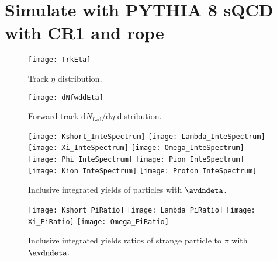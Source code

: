 
\section{Simulate with PYTHIA 8 sQCD with CR1 and rope}%
\label{sec:CRorRope}

\begin{figure}[t]
        \begin{center}
                \texttt{[image: TrkEta]}
        \end{center}
        \caption{Track $\eta$ distribution.}
        \label{fig:TrkEta}
\end{figure}

\begin{figure}[t]
	\begin{center}
		\texttt{[image: dNfwddEta]}
	\end{center}
	\caption{Forward track $\mathrm{d}N_\mathrm{fwd}/\mathrm{d}\eta$ distribution.}
	\label{fig:TrkdNdEta}
\end{figure}

\begin{figure}[ht]
	\begin{center}
		\texttt{[image: Kshort\_InteSpectrum]}
		\texttt{[image: Lambda\_InteSpectrum]}
		\texttt{[image: Xi\_InteSpectrum]}
		\texttt{[image: Omega\_InteSpectrum]}
		\texttt{[image: Phi\_InteSpectrum]}
		\texttt{[image: Pion\_InteSpectrum]}
		\texttt{[image: Kion\_InteSpectrum]}
		\texttt{[image: Proton\_InteSpectrum]}
	\end{center}
	\caption{Inclusive integrated yields of particles with $\avdndeta$.}
	\label{fig:InclIntePar}
\end{figure}

\begin{figure}[ht]
	\begin{center}
		\texttt{[image: Kshort\_PiRatio]}
		\texttt{[image: Lambda\_PiRatio]}
		\texttt{[image: Xi\_PiRatio]}
		\texttt{[image: Omega\_PiRatio]}
	\end{center}
	\caption{Inclusive integrated yields ratios of strange particle to $\pi$ with $\avdndeta$.}
	\label{fig:InclIntePartoPiRatio}
\end{figure}

